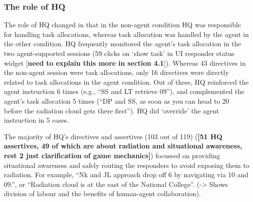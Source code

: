 \subsubsection{The role of HQ}
The role of HQ changed in that in the non-agent condition HQ was responsible for handling task allocations, whereas task allocation was handled by the agent in the other condition. HQ frequently monitored the agent's task allocation in the two agent-supported sessions (59 clicks on `show task' in UI responder status widget [\textbf{need to explain this more in section 4.1}]). Whereas 43 directives in the non-agent session were task allocations, only 16 directives were directly related to task allocations in the agent condition. Out of these, HQ reinforced the agent instruction 6 times (e.g., ``SS and LT retrieve 09''), and complemented the agent's task allocation 5 times (``DP and SS, as soon as you can head to 20 before the radiation cloud gets there first''). HQ did `override' the agent instruction in 5 cases.  

The majority of HQ's directives and assertives (103 out of 119) (\textbf{[51 HQ assertives, 49 of which are about radiation and situational awareness, rest 2 just clarification of  game mechanics]}) focussed on providing situational awareness and safely routing the responders to avoid exposing them to radiation. For example, ``Nk and JL approach drop off 6 by navigating via 10 and 09.'', or ``Radiation cloud is at the east of the National College''. (-> Shows division of labour and the benefits of human-agent collaboration).

